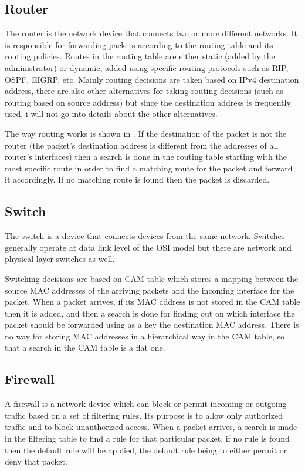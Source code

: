 \subsection{Router}
\label{sub-sec:router}
The router is the network device that connects two or more different networks. It is responsible for 
forwarding packets according to the routing table and its routing policies. Routes in the routing table 
are either static (added by the administrator) or dynamic, added using specific routing protocols such as RIP, OSPF, EIGRP, etc.
Mainly routing decisions are taken based on IPv4 destination address, there are also other alternatives for taking routing 
decisions (such as routing based on source address) but since the destination address is frequently used, 
i will not go into details about the other alternatives. 

The way routing works is shown in .
If the destination of the packet is not the router (the packet's destination address is different from the 
addresses of all router's interfaces) then a search is done in the routing table starting with the most 
specific route in order to find a matching route for the packet and forward it accordingly. If no
matching route is found then the packet is discarded.
\subsection{Switch}
\label{sub-sec:switch}
The switch is a device that connects devices from the same network. Switches generally operate at 
data link level of the OSI model but there are network and physical layer switches as well. 

Switching decisions are based on CAM table which stores a mapping between the source MAC addresses 
of the arriving packets and the incoming interface for the packet. When a packet arrives, if its 
MAC address is not stored in the CAM table then it is added, and then a search is done for finding 
out on which interface the packet should be forwarded using as a key the destination MAC address. 
There is no way for storing MAC addresses in a hierarchical way in the CAM table, so that a search in 
the CAM table is a flat one.     

\subsection{Firewall}
\label{sub-sec:firewall}
A firewall is a network device which can block or permit incoming or outgoing traffic based on a set 
of filtering rules. Its purpose is to allow only authorized traffic and to block unauthorized access.
When a packet arrives, a search is made in the filtering table to find a rule for that particular packet, 
if no rule is found then the default rule will be applied, the default rule being to either permit or deny 
that packet. 

